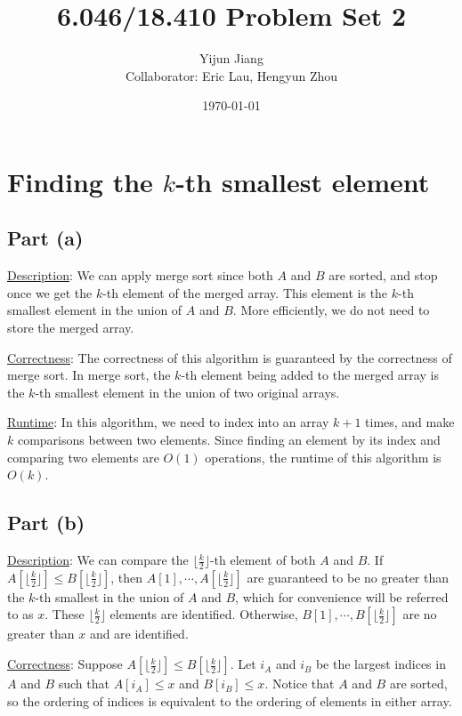 \documentclass{article}
\title{6.046/18.410 Problem Set 2}
\author{Yijun Jiang\\Collaborator: Eric Lau, Hengyun Zhou}
\date{\today}
\begin{document}
\maketitle

\section{Finding the $k$-th smallest element}
\subsection{Part (a)}
\noindent\underline{Description}: We can apply merge sort since both $A$ and $B$ are sorted, and stop once we get the $k$-th element of the merged array. This element is the $k$-th smallest element in the union of $A$ and $B$. More efficiently, we do not need to store the merged array.

\noindent\underline{Correctness}: The correctness of this algorithm is guaranteed by the correctness of merge sort. In merge sort, the $k$-th element being added to the merged array is the $k$-th smallest element in the union of two original arrays.

\noindent\underline{Runtime}: In this algorithm, we need to index into an array $k+1$ times, and make $k$ comparisons between two elements. Since finding an element by its index and comparing two elements are $O(1)$ operations, the runtime of this algorithm is $O(k)$.

\subsection{Part (b)}
\noindent\underline{Description}: We can compare the $\lfloor\frac{k}{2}\rfloor$-th element of both $A$ and $B$. If $A[\lfloor\frac{k}{2}\rfloor]\leqslant B[\lfloor\frac{k}{2}\rfloor]$, then $A[1],\cdots,A[\lfloor\frac{k}{2}\rfloor]$ are guaranteed to be no greater than the $k$-th smallest in the union of $A$ and $B$, which for convenience will be referred to as $x$. These $\lfloor\frac{k}{2}\rfloor$ elements are identified. Otherwise, $B[1],\cdots,B[\lfloor\frac{k}{2}\rfloor]$ are no greater than $x$ and are identified.

\noindent\underline{Correctness}: Suppose $A[\lfloor\frac{k}{2}\rfloor]\leqslant B[\lfloor\frac{k}{2}\rfloor]$. Let $i_A$ and $i_B$ be the largest indices in $A$ and $B$ such that $A[i_A]\leqslant x$ and $B[i_B]\leqslant x$. Notice that $A$ and $B$ are sorted, so the ordering of indices is equivalent to the ordering of elements in either array.
\end{document}
